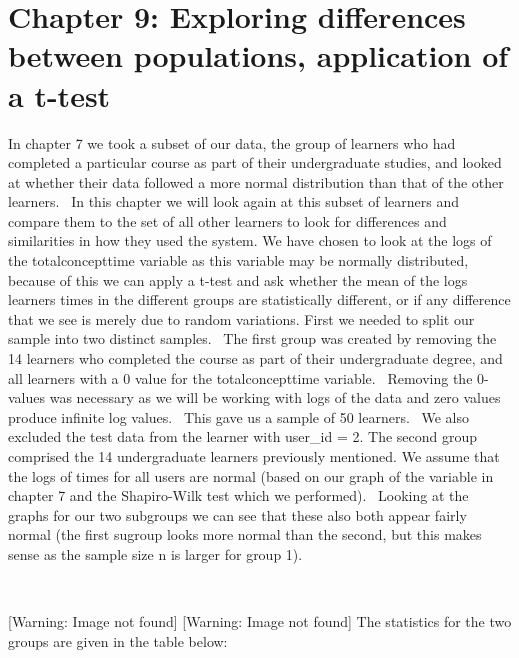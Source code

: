 \documentclass[12pt,twoside]{article}
\begin{document}
\section{Chapter 9: Exploring differences between populations,
application of a t{}-test }
\newline
In chapter 7 we took a subset of our data, the group of learners who had
completed a particular course as part of their undergraduate studies,
and looked at whether their data followed a more normal distribution
than that of the other learners.~ In this chapter we will look again at
this subset of learners and compare them to the set of all other
learners to look for differences and similarities in how they used the
system.\newline
We have chosen to look at the logs of the totalconcepttime variable as
this variable may be normally distributed, because of this we can apply
a t{}-test and ask whether the mean of the logs
learners{\textquotesingle} times in the different groups are
statistically different, or if any difference that we see is merely due
to random variations.\newline
First we needed to split our sample into two distinct samples.~ The
first group was created by removing the 14 learners who completed the
course as part of their undergraduate degree, and all learners with a 0
value for the totalconcepttime variable.~ Removing the 0{}-values was
necessary as we will be working with logs of the data and zero values
produce infinite log values.~ This gave us a sample of 50 learners.~ We
also excluded the test data from the learner with user\_id = 2.\newline
The second group comprised the 14 undergraduate learners previously
mentioned.\newline
\newline
We assume that the logs of times for all users are normal (based on our
graph of the variable in chapter 7 and the Shapiro{}-Wilk test which we
performed).~ Looking at the graphs for our two subgroups we can see
that these also both appear fairly normal (the first sugroup looks more
normal than the second, but this makes sense as the sample size n is
larger for group 1). 

\newline
~ 

 [Warning: Image not found]  
 [Warning: Image not found]  
\newline
\newline
The statistics for the two groups are given in the table below:
\end{document}
